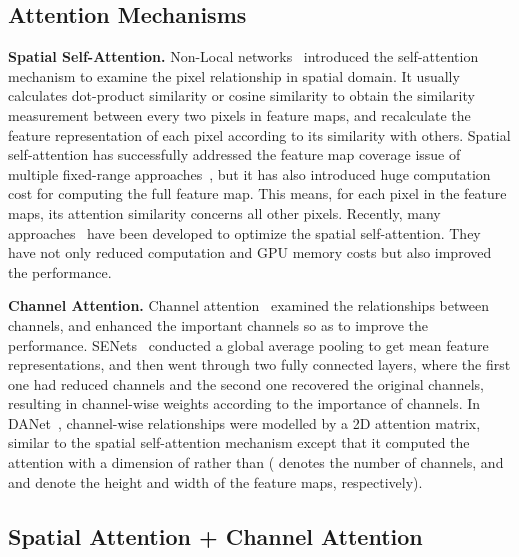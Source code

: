 \documentclass[journal]{IEEEtran}
\begin{document}
\subsection{Attention Mechanisms}

\textbf{Spatial Self-Attention.}
Non-Local networks~\cite{cNonLocal} introduced the self-attention mechanism to examine the pixel relationship in spatial domain. 
It usually calculates dot-product similarity or cosine similarity to obtain the similarity measurement between every two pixels in feature maps, and recalculate the feature representation of each pixel according to its similarity with others. 
Spatial self-attention has successfully addressed the feature map coverage issue of multiple fixed-range approaches~\cite{cDeepLab, cPSPNet, cDenseASPP}, but it has also introduced huge computation cost for computing the full feature map. 
This means, for each pixel in the feature maps, its attention similarity concerns all other pixels. 
Recently, many approaches~\cite{cA2Net,cCCNet,cANNN,cAxialAttention} have been developed to optimize the spatial self-attention. They have not only reduced computation and GPU memory costs but also improved the performance.

\textbf{Channel Attention.}
Channel attention~\cite{cSENet} examined the relationships between channels, and enhanced the important channels so as to improve the performance. 
SENets~\cite{cSENet} conducted a global average pooling to get mean feature representations, and then went through two fully connected layers, where the first one had reduced channels and the second one recovered the original channels, resulting in channel-wise weights according to the importance of channels. 
In DANet~\cite{cDualAttention}, channel-wise relationships were modelled by a 2D attention matrix, similar to the spatial self-attention mechanism except that it computed the attention with a dimension of  rather than  ( denotes the number of channels, and  and  denote the height and width of the feature maps, respectively).

\subsection{Spatial Attention + Channel Attention}
\label{secDualAttentionDesign}
\end{document}

